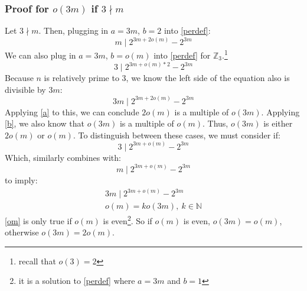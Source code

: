 \documentclass{article}
\begin{document}
  \subsubsection{Proof for  $o(3m)$ if $3 \nmid m$}
  Let $3 \nmid m$. Then, plugging in $a = 3m$, $b = 2$ into \eqref{perdef}:
  \begin{equation}
    m \mid 2^{3m+2o(m)}-2^{3m}
  \end{equation}
  We can also plug in $a = 3m$, $b = o(m)$ into \eqref{perdef} for $\mathbb{Z}_3$.\footnote{recall that $o(3) = 2$}
  \begin{equation}
    3 \mid 2^{3m+o(m)*2}-2^{3m} 
  \end{equation}
  Because $n$ is relatively prime to 3, we know the left side of the equation also is divisible by $3m$:
  \begin{equation}
    3m \mid 2^{3m+2o(m)} - 2^{3m}
  \end{equation}
  Applying \eqref{a} to this, we can conclude $2o(m)$ is a multiple of $o(3m)$. Applying \eqref{b}, we also know that $o(3m)$ is a multiple of $o(m)$. Thus, $o(3m)$ is either $2o(m)$ or $o(m)$. To distinguish between these cases, we must consider if:
  \begin{equation}\label{om}
    3 \mid 2^{3m + o(m)} - 2^{3m}
  \end{equation}
  Which, similarly combines with:
  \begin{equation}
    m \mid 2^{3m + o(m)} - 2^{3m}
  \end{equation}
  to imply:
  \begin{align}
    3m \mid 2^{3m + o(m)} - 2^{3m} \\
    o(m) = ko(3m),\  k \in \mathbb{N}
  \end{align}
  \eqref{om} is only true if $o(m)$ is even\footnote{it is a solution to \eqref{perdef} where $a = 3m$ and $b = 1$}. So if $o(m)$ is even, $o(3m) = o(m)$, otherwise $o(3m) = 2o(m)$.
\end{document}
